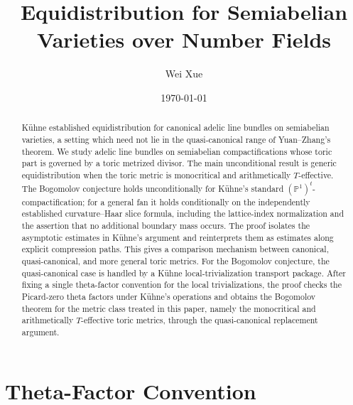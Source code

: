 \documentclass[10pt,a4paper]{amsart}
\theoremstyle{plain}
\theoremstyle{plain}
\numberwithin{equation}{section}
\begin{document}
\title{Equidistribution for Semiabelian Varieties over Number Fields}
\author{Wei Xue}
\date{\today}

\begin{abstract}
	K\"uhne established equidistribution for canonical adelic line bundles on
	semiabelian varieties, a setting which need not lie in the quasi-canonical
	range of Yuan--Zhang's theorem.  We study adelic line bundles on semiabelian
	compactifications whose toric part is governed by a toric metrized divisor.
	The main unconditional result is generic equidistribution when the toric metric
	is monocritical and arithmetically \(T\)-effective.  The Bogomolov conjecture
	holds unconditionally for K\"uhne's standard \((\mathbb P^1)^t\)-compactification;
	for a general fan it holds conditionally on the independently established
	curvature--Haar slice formula, including the lattice-index normalization and
	the assertion that no additional boundary mass occurs.
	The proof isolates the asymptotic estimates in K\"uhne's argument and
	reinterprets them as estimates along explicit compression paths.  This gives a
	comparison mechanism between canonical, quasi-canonical, and more general
	toric metrics.  For the Bogomolov conjecture, the quasi-canonical case is
	handled by a K\"uhne local-trivialization transport package.  After fixing a
	single theta-factor convention for the local trivializations, the proof checks
	the Picard-zero theta factors under K\"uhne's operations and obtains the
	Bogomolov theorem for the metric class treated in this paper, namely the
	monocritical and arithmetically \(T\)-effective toric metrics, through the
	quasi-canonical replacement argument.
\end{abstract}
\maketitle

\section*{Theta-Factor Convention}
\end{document}
